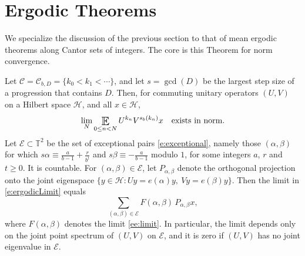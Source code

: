 
\section{Ergodic Theorems} \label{s;meanErgodic}
We specialize the discussion of the previous section to that of mean ergodic theorems along Cantor sets of integers.   The core is this Theorem for norm convergence. 

\begin{theorem} \label{t:ergodic}
Let $\mathcal C = \mathcal C _{b,D}=\{k_0<k_1<\cdots\}$, and let $s=\gcd(D)$ be the largest  step size of a progression that contains $D$. 
Then,  for commuting unitary operators $(U,V)$ on a Hilbert space $\mathcal H$, and all $x\in \mathcal H$, 
\begin{equation} \label{e:ergodicLimit}
  \lim_N  \Expectation_{0\leq n<N} U^{k_n} V^{s_b(k_n)} x\quad \textup{exists in norm}. 
 \end{equation}
Let $\mathcal E\subset \mathbb T ^2 $ be the set of exceptional pairs \eqref{e:exceptional}, namely those $(\alpha ,\beta )$ for which 
$s\alpha \equiv \frac{a}{b-1}+\frac {r}{b^t}$ and $s\beta \equiv - \frac{a}{b-1}$ modulo $1$, for some integers $a$, $r$ and $t\geq 0$. 
It is countable. 
For $(\alpha ,\beta )\in \mathcal E$, let $P_{\alpha ,\beta }$ denote the orthogonal projection onto the joint eigenspace 
$\{y\in \mathcal H\colon Uy=e(\alpha )y, \ Vy=e(\beta )y\}$. 
Then the limit in \eqref{e:ergodicLimit} equals 
\begin{equation} \label{e:ergodicFormula}
    \sum_{(\alpha ,\beta )\in \mathcal E} F(\alpha ,\beta ) \, P_{\alpha ,\beta } x , 
\end{equation}
where $F(\alpha ,\beta )$ denotes the limit \eqref{ee:limit}. 
In particular, the limit depends only on the joint point spectrum of $(U,V)$ on $\mathcal E$, and it is zero if $(U,V)$ has no joint eigenvalue in $\mathcal E$. 
\end{theorem}




